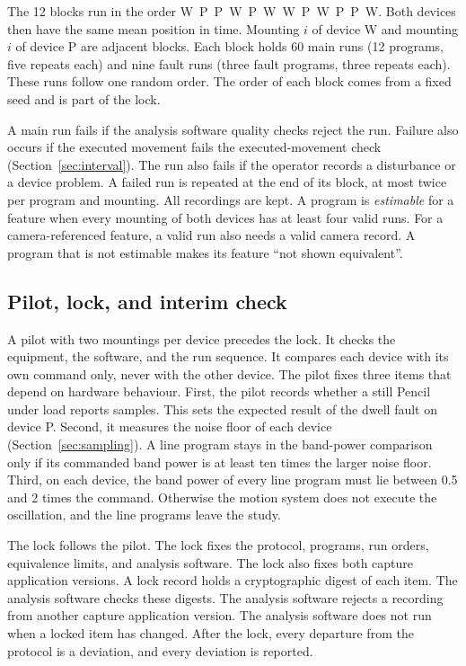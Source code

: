 The 12 blocks run in the order W~P~P~W~P~W~W~P~W~P~P~W.
Both devices then have the same mean position in time.
Mounting $i$ of device W and mounting $i$ of device P are adjacent blocks.
Each block holds 60 main runs (12 programs, five repeats each) and nine fault runs (three fault programs, three repeats each).
These runs follow one random order.
The order of each block comes from a fixed seed and is part of the lock.

A main run fails if the analysis software quality checks reject the run.
Failure also occurs if the executed movement fails the executed-movement check (Section~\ref{sec:interval}).
The run also fails if the operator records a disturbance or a device problem.
A failed run is repeated at the end of its block, at most twice per program and mounting.
All recordings are kept.
A program is \emph{estimable} for a feature when every mounting of both devices has at least four valid runs.
For a camera-referenced feature, a valid run also needs a valid camera record.
A program that is not estimable makes its feature ``not shown equivalent''.

\subsection{Pilot, lock, and interim check}
\label{sec:lock}
A pilot with two mountings per device precedes the lock.
It checks the equipment, the software, and the run sequence.
It compares each device with its own command only, never with the other device.
The pilot fixes three items that depend on hardware behaviour.
First, the pilot records whether a still Pencil under load reports samples.
This sets the expected result of the dwell fault on device P.
Second, it measures the noise floor of each device (Section~\ref{sec:sampling}).
A line program stays in the band-power comparison only if its commanded band power is at least ten times the larger noise floor.
Third, on each device, the band power of every line program must lie between 0.5 and 2 times the command.
Otherwise the motion system does not execute the oscillation, and the line programs leave the study.

The lock follows the pilot.
The lock fixes the protocol, programs, run orders, equivalence limits, and analysis software.
The lock also fixes both capture application versions.
A lock record holds a cryptographic digest of each item.
The analysis software checks these digests.
The analysis software rejects a recording from another capture application version.
The analysis software does not run when a locked item has changed.
After the lock, every departure from the protocol is a deviation, and every deviation is reported.

